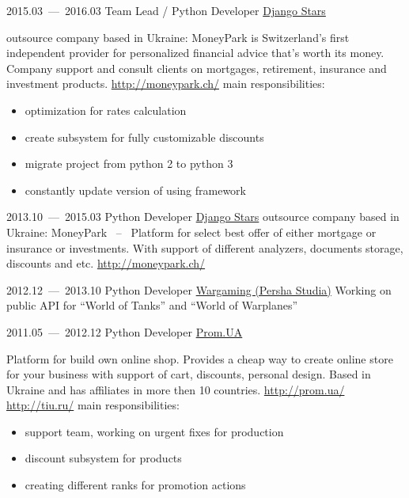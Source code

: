 \documentclass[11pt,a4paper,oneside]{moderncv}
\begin{document}
        \cventry
            {2015.03~---~2016.03}
            {Team Lead / Python Developer}
            {\href{http://djangostars.com}{Django Stars}}
            {}{}
            {
              outsource company based in Ukraine:\newline
              MoneyPark is Switzerland's first independent provider for personalized financial advice that's worth its money. Company support and consult clients on mortgages, retirement, insurance and investment products. \url{http://moneypark.ch/}\newline
              main responsibilities:
              \begin{itemize}
                \item optimization for rates calculation
                \item create subsystem for fully customizable discounts
                \item migrate project from python 2 to python 3
                \item constantly update version of using framework
              \end{itemize}
            }

        \cventry
            {2013.10~---~2015.03}
            {Python Developer}
            {\href{http://djangostars.com}{Django Stars}}
            {}{}
            {
              outsource company based in Ukraine:\newline
              MoneyPark ~--~ Platform for select best offer of either mortgage or insurance or investments. With support of different analyzers, documents storage, discounts and etc. \url{http://moneypark.ch/}
            }

        \cventry
            {2012.12~---~2013.10}
            {Python Developer}
            {\href{https://wargaming.com/}{Wargaming (Persha Studia)}}
            {}{}
            {
              Working on public API for ``World of Tanks'' and ``World of Warplanes''
            }

        \cventry
            {2011.05~--–~2012.12}
            {Python Developer}
            {\href{https://prom.ua/}{Prom.UA}}
            {}{}
            {
              Platform for build own online shop. Provides a cheap way to create online store for your business with support of cart, discounts, personal design. Based in Ukraine and has affiliates in more then 10 countries. \url{http://prom.ua/} \url{http://tiu.ru/}\newline
              main responsibilities:
              \begin{itemize}
                \item support team, working on urgent fixes for production
                \item discount subsystem for products
                \item creating different ranks for promotion actions
              \end{itemize}
            }
\end{document}
